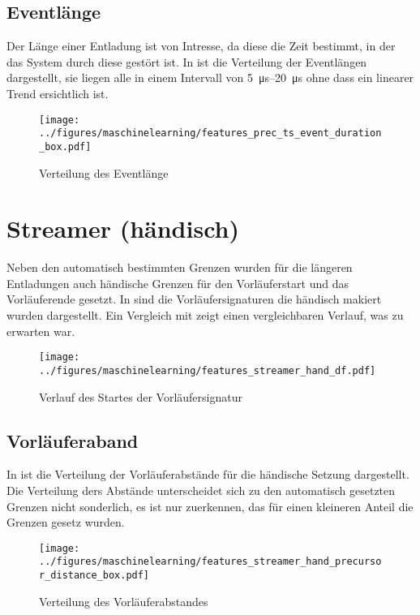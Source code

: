 \subsection{Eventlänge}
Der Länge einer Entladung ist von Intresse, da diese die Zeit bestimmt, in der das System durch diese gestört ist. In  ist die Verteilung der Eventlängen dargestellt, sie liegen alle in einem Intervall von \SIrange{5}{20}{\micro\second} ohne dass ein linearer Trend ersichtlich ist.

\begin{figure}[htbp]
    \centering
      \texttt{[image: ../figures/maschinelearning/features\_prec\_ts\_event\_duration\_box.pdf]}
      \caption{Verteilung des Eventlänge}
      \label{fig:prec_ts_event_duration_box}
\end{figure}

\section{Streamer (händisch)}
Neben den automatisch bestimmten Grenzen wurden für die längeren Entladungen auch händische Grenzen für den Vorläuferstart und das Vorläuferende gesetzt. In  sind die Vorläufersignaturen die händisch makiert wurden dargestellt. Ein Vergleich mit  zeigt einen vergleichbaren Verlauf, was zu erwarten war.

\begin{figure}[htbp]
    \centering
      \texttt{[image: ../figures/maschinelearning/features\_streamer\_hand\_df.pdf]}
      \caption{Verlauf des Startes der Vorläufersignatur}
      \label{fig:streamer_current_sliece}
\end{figure}

\subsection{Vorläuferaband}
In  ist die Verteilung der Vorläuferabstände für die händische Setzung dargestellt. Die Verteilung ders Abstände unterscheidet sich zu den automatisch gesetzten Grenzen nicht sonderlich, es ist nur zuerkennen, das für einen kleineren Anteil die Grenzen gesetz wurden.

\begin{figure}[htbp]
    \centering
      \texttt{[image: ../figures/maschinelearning/features\_streamer\_hand\_precursor\_distance\_box.pdf]}
      \caption{Verteilung des Vorläuferabstandes}
      \label{fig:streamer_hand_prec_distance_box}
\end{figure}


